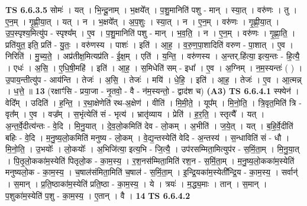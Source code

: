 \documentclass[17pt]{extarticle}
\begin{document}
                  \newline
                                \textbf{ TS 6.6.3.5} \newline
                  सोमः॑ । यत् । भि॒न्दू॒नाम् । भ॒क्षये᳚त् । प॒शु॒मानिति॑ पशु - मान् । स्या॒त् । वरु॑णः । तु । ए॒न॒म् । गृ॒ह्णी॒या॒त् । यत् । न । भ॒क्षये᳚त् । अ॒प॒शुः । स्या॒त् । न । ए॒न॒म् । वरु॑णः । गृ॒ह्णी॒या॒त् । उ॒प॒स्पृश्य॒मित्यु॑प - स्पृश्य᳚म् । ए॒व । प॒शु॒मानिति॑ पशु - मान् । भ॒व॒ति॒ । न । ए॒न॒म् । वरु॑णः । गृ॒ह्णा॒ति॒ । प्रति॑युत॒ इति॒ प्रति॑ - यु॒तः॒ । वरु॑णस्य । पाशः॑ । इति॑ । आ॒ह॒ । व॒रु॒ण॒पा॒शादिति॑ वरुण - पा॒शात् । ए॒व । निरिति॑ । मु॒च्य॒ते॒ । अप्र॑तीक्ष॒मित्यप्र॑ति - ई॒क्ष॒म् । एति॑ । य॒न्ति॒ । वरु॑णस्य । अ॒न्तर्.हि॑त्या॒ इत्य॒न्तः - हि॒त्यै॒ । एधः॑ । अ॒सि॒ । ए॒धि॒षी॒महि॑ । इति॑ । आ॒ह॒ । स॒मिधेति॑ सम् - इधा᳚ । ए॒व । अ॒ग्निम् । न॒म॒स्यन्तः॑ ( ) । उ॒पाय॒न्तीत्यु॑प - आय॑न्ति । तेजः॑ । अ॒सि॒ । तेजः॑ । मयि॑ । धे॒हि॒ । इति॑ । आ॒ह॒ । तेजः॑ । ए॒व । आ॒त्मन्न् । ध॒त्ते॒ ॥ \textbf{  13} \newline
                  \newline
                      (रक्षाꣳ॑सि - प्रया॒जा - नृ॒तवो॒ - वै - न॑म॒स्यन्तो॒ - द्वाद॑श च)  \textbf{(A3)} \newline \newline
                                \textbf{ TS 6.6.4.1} \newline
                  स्फ्येन॑ । वेदि᳚म् । उदिति॑ । ह॒न्ति॒ । र॒था॒क्षेणेति॑ रथ-अ॒क्षेण॑ । वीति॑ । मि॒मी॒ते॒ । यूप᳚म् । मि॒नो॒ति॒ । त्रि॒वृत॒मिति॑ त्रि - वृत᳚म् । ए॒व । वज्र᳚म् । स॒भृंत्येति॑ सं - भृत्य॑ । भ्रातृ॑व्याय । प्रेति॑ । ह॒र॒ति॒ । स्तृत्यै᳚ । यत् । अ॒न्त॒र्वे॒दीत्य॑न्तः - वे॒दि । मि॒नु॒यात् । दे॒व॒लो॒कमिति॑ देव - लो॒कम् । अ॒भीति॑ । ज॒ये॒त् । यत् । ब॒हि॒र्वे॒दीति॑ बहिः - वे॒दि । म॒नु॒ष्य॒लो॒कमिति॑ मनुष्य - लो॒कम् । वे॒द्य॒न्तस्येति॑ वेदि - अ॒न्तस्य॑ । स॒न्धाविति॑ सं - धौ । मि॒नो॒ति॒ । उ॒भयोः᳚ । लो॒कयोः᳚ । अ॒भिजि॑त्या॒ इत्य॒भि - जि॒त्यै॒ । उप॑रसम्मिता॒मित्युप॑र - स॒मिं॒ता॒म् । मि॒नु॒या॒त् । पि॒तृ॒लो॒कका॑म॒स्येति॑ पितृलो॒क - का॒म॒स्य॒ । र॒श॒नस॑म्मिता॒मिति॑ रश॒न - स॒मिं॒ता॒म् । म॒नु॒ष्य॒लो॒कका॑म॒स्येति॑ मनुष्यलो॒क - का॒म॒स्य॒ । च॒षाल॑संमिता॒मिति॑ च॒षाल॑ - स॒मिं॒ता॒म् । इ॒न्द्रि॒यका॑म॒स्येती᳚न्द्रि॒य - का॒म॒स्य॒ । सर्वान्॑ । स॒मान् । प्र॒ति॒ष्ठाका॑म॒स्येति॑ प्रति॒ष्ठा - का॒म॒स्य॒ । ये । त्रयः॑ । म॒द्ध्य॒माः । तान् । स॒मान् । प॒शुका॑म॒स्येति॑ प॒शु - का॒म॒स्य॒ । ए॒तान् । वै । \textbf{  14} \newline
                  \newline
                                \textbf{ TS 6.6.4.2} \newline
\end{document}
